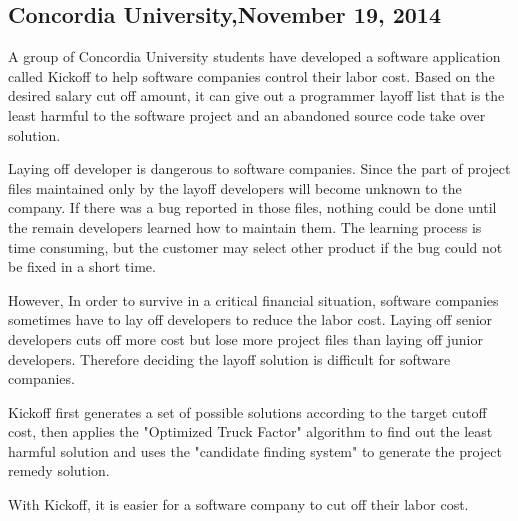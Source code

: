 
\subsection*{Concordia University,November 19, 2014}
A group of Concordia University students have developed a software application called Kickoff to help software companies control their labor cost. Based on the desired salary cut off amount, it can give out a programmer layoff list that is the least harmful to the software project and an abandoned source code take over solution.

Laying  off developer is dangerous to software companies. Since the part of project files maintained only by the layoff developers will become unknown to the company. If there was a bug reported in those files, nothing could be done until the remain developers learned how to maintain them. The learning process is time consuming, but the customer may select other product if the bug could not be fixed in a short time.  

However, In order to survive in a critical financial situation, software companies sometimes have to lay off developers to reduce the labor cost. Laying off senior developers cuts off more cost but lose more project files than laying off junior developers. Therefore deciding the layoff solution is difficult for software companies.

Kickoff first generates a set of possible solutions according to the target cutoff cost, then applies the "Optimized Truck Factor" algorithm to find out the least harmful solution and uses the "candidate finding system" to generate the project remedy solution. 

With Kickoff, it is easier for a software company to cut off their labor cost.  




